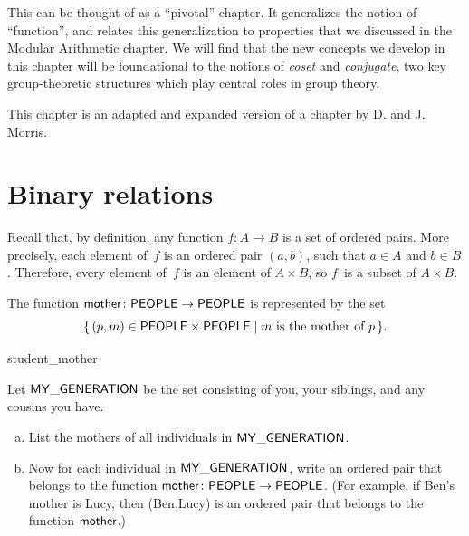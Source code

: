 



\medskip\noindent

This can be thought of as a ``pivotal'' chapter. It generalizes the notion of ``function'', and relates this generalization to properties that we discussed in the Modular Arithmetic chapter. We will find that the new concepts we develop in this chapter will be foundational to the notions of \emph{coset} and \emph{conjugate}, two key group-theoretic structures which play central roles in group theory.
\medskip

This chapter  is an adapted and expanded version of a chapter by D. and J. Morris.

\section{Binary relations} \label{sec.relation}


 Recall that, by definition, any function $f \colon A \to B$ is a set of ordered pairs. More precisely, each element of~$f$ is an ordered pair $(a,b)$, such that $a \in A$ and $b \in B$. Therefore, every element of~$f$ is an element of $A \times B$, so $f$~is a subset of $A \times B$.


\begin{eg} 
The function $\sf{mother} \colon \sf{PEOPLE} \to \sf{PEOPLE}$ is represented by the set
\[ \{\, (p,m)  \in  {\sf{P}EOPLE} \times {\sf{P}EOPLE}  \mid  m  \text{  is the mother of } p \,\} .\]
\end{eg}

\begin{exercise}{student_mother}

\noindent
Let $\sf{MY\_GENERATION}$ be the set consisting  of you, your siblings, and any cousins you have.  
\begin{enumerate}[(a)]
\item
List the mothers of all individuals in $\sf{MY\_GENERATION}$.
\item
Now for each individual in $\sf{MY\_GENERATION}$, write an ordered pair that belongs to the function $\sf{mother} \colon \sf{PEOPLE} \to \sf{PEOPLE}$. (For example, if Ben's  mother is Lucy, then (Ben,Lucy) is an ordered pair that belongs to the function $\sf{mother}$.)
\end{enumerate}
\end{exercise}


